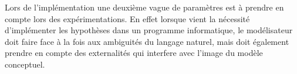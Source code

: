 



















Lors de l'implémentation une deuxième vague de paramètres est à prendre en compte lors des expérimentations. En effet lorsque vient la nécessité d'implémenter les hypothèses dans un programme informatique, le modélisateur doit faire face à la fois aux ambiguités du langage naturel, mais doit également prendre en compte des externalités qui interfere avec l'image du modèle conceptuel.

